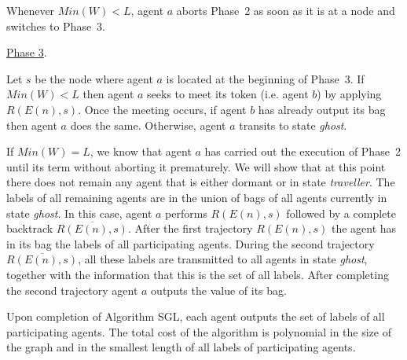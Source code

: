 \documentclass [11pt] {article}
\begin{document}
{Whenever $Min(W)<L$, agent $a$ aborts Phase~2 as soon as it is at a node and switches to Phase~3.}

\noindent  \underline{Phase 3}.


{Let $s$ be the node where agent $a$ is located at the beginning of Phase~3.
If $Min(W)<L$ then agent $a$ seeks to meet its token (i.e. agent $b$) by applying $R(E(n),s)$. Once the meeting occurs, if agent $b$ has already output its bag then agent $a$ does the same. Otherwise, agent $a$ transits to state {\em ghost}.}

{If $Min(W)=L$, we know that agent $a$ has carried out the execution of Phase~2 until its term without aborting it prematurely. We will show that
at this point  there does not remain any agent that is either dormant or in state {\em traveller}. The labels of all remaining agents are in the union of bags of all agents currently in state {\em ghost}. In this case, agent $a$  performs $R(E(n),s)$ followed by a complete backtrack $\overline{R(E(n),s)}$.
After the first trajectory $R(E(n),s)$ the agent has in its bag the labels of all participating agents.
During the second trajectory $\overline{R(E(n),s)}$, all these labels are transmitted to all agents in state {\em ghost}, together with the information that this is the set of all labels. After completing the second trajectory
agent $a$ outputs the value of its bag.}

\begin{theorem}\label{sgl} 
Upon completion of Algorithm SGL, each agent outputs the set of labels of all participating agents. The total cost of the algorithm is polynomial 
in the size of the graph 
and in the smallest length of all labels of participating agents.
\end{theorem}
\end{document}
